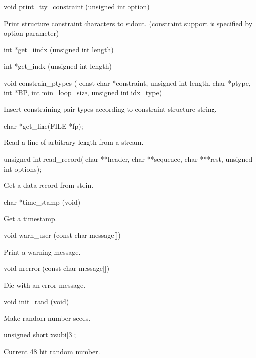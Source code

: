 \begin{DoxyVerb}void print_tty_constraint (unsigned int option)
\end{DoxyVerb}
 Print structure constraint characters to stdout. (constraint support is specified by option parameter)

\begin{DoxyVerb}int   *get_iindx (unsigned int length)
\end{DoxyVerb}


\begin{DoxyVerb}int   *get_indx (unsigned int length)
\end{DoxyVerb}


\begin{DoxyVerb}void constrain_ptypes (
                const char *constraint,
                unsigned int length,
                char *ptype,
                int *BP,
                int min_loop_size,
                unsigned int idx_type)
\end{DoxyVerb}
 Insert constraining pair types according to constraint structure string.

\begin{DoxyVerb}char  *get_line(FILE *fp);
\end{DoxyVerb}
 Read a line of arbitrary length from a stream.

\begin{DoxyVerb}unsigned int read_record(
                char **header,
                char **sequence,
                char ***rest,
                unsigned int options);
\end{DoxyVerb}
 Get a data record from stdin.

\begin{DoxyVerb}char  *time_stamp (void)
\end{DoxyVerb}
 Get a timestamp.

\begin{DoxyVerb}void warn_user (const char message[])
\end{DoxyVerb}
 Print a warning message.

\begin{DoxyVerb}void nrerror (const char message[])
\end{DoxyVerb}
 Die with an error message.

\begin{DoxyVerb}void   init_rand (void)
\end{DoxyVerb}
 Make random number seeds.

\begin{DoxyVerb}unsigned short xsubi[3];
\end{DoxyVerb}
 Current 48 bit random number.

